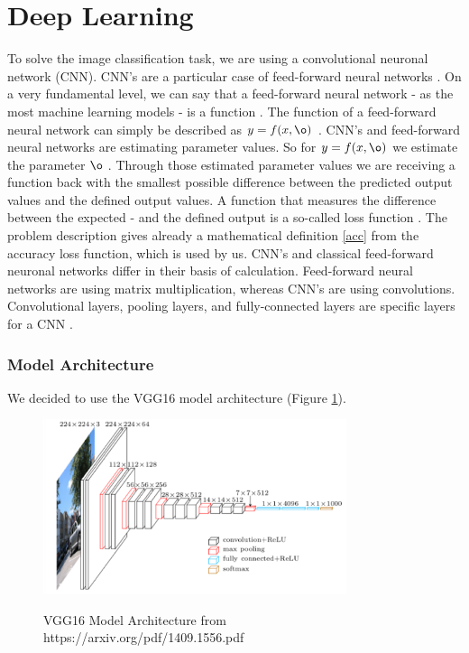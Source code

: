 \documentclass[journal]{IEEEtran}
\begin{document}
\section{Deep Learning}
\noindent To solve the image classification task, we are using a convolutional neuronal network (CNN). CNN's are a particular case of feed-forward neural networks \cite{Goodfellow-et-al-2016}. On a very fundamental level, we can say that a feed-forward neural network - as the most machine learning models - is a function \cite{RN5}. The function of a feed-forward neural network can simply be described as \(y = f(x, \o )\) . CNN's and feed-forward neural networks are estimating parameter values. So for \(y = f(x, \o )\) we estimate the parameter \(\o \) \cite{Goodfellow-et-al-2016}. Through those estimated parameter values we are receiving a function back with the smallest possible difference between the predicted output values and the defined output values. A function that measures the difference between the expected - and the defined output is a so-called loss function \cite{Goodfellow-et-al-2016}. The problem description gives already a mathematical definition \eqref{acc} from the accuracy loss function, which is used by us. 
CNN's and classical feed-forward neuronal networks differ in their basis of calculation. Feed-forward neural networks are using matrix multiplication, whereas CNN's are using convolutions. Convolutional layers, pooling layers, and fully-connected layers are specific layers for a CNN \cite{LeCun1998}. \\

\subsubsection{Model Architecture}
We decided to use the VGG16 model architecture \cite{RN15} (Figure \ref{vgg16}). 

\begin{figure}
  \begin{center}
	  \includegraphics[width=3.5in]{photo/vgg16.png}\\
  \caption{VGG16 Model Architecture from https://arxiv.org/pdf/1409.1556.pdf}\label{vgg16}
  \end{center}
\end{figure}
\end{document}
